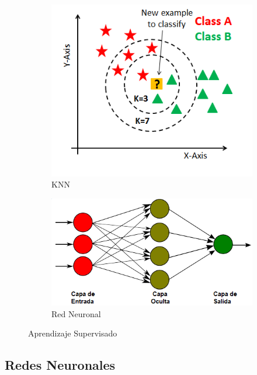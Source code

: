 \begin{figure}[!h]
	\centering
	
	
	\begin{subfigure}[t]{0.4\textwidth}
		\centering
		\includegraphics[width=\textwidth]{images/chapter_2/knn}
		\caption{KNN}
		\label{fig:knn}
	\end{subfigure}
	\hfill
	\begin{subfigure}[t]{0.5\textwidth}
		\centering
		\includegraphics[width=\textwidth]{images/chapter_2/redneu}
		\caption{Red Neuronal}
		\label{fig:redneu}
	\end{subfigure}
	
	\caption{Aprendizaje Supervisado}
	\label{fig:aprendizajeSupervisado}
\end{figure}

\subsection{Redes Neuronales}

